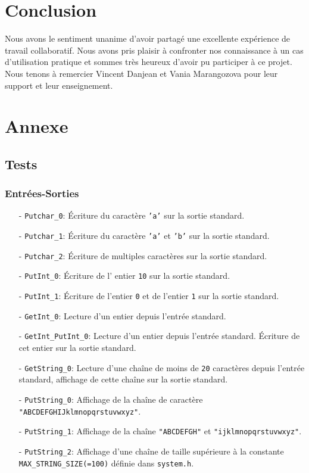 \documentclass[11pt]{article}
\theoremstyle{definition}
\theoremstyle{definition}
\begin{document}
\section{Conclusion}
Nous avons le sentiment unanime d'avoir partagé une excellente expérience de travail collaboratif. Nous avons pris plaisir à confronter nos connaissance à un cas d'utilisation pratique et sommes très heureux d'avoir pu participer à ce projet. Nous tenons à remercier Vincent Danjean et Vania Marangozova pour leur support et leur enseignement.
\section{Annexe}

\subsection{Tests}

\subsubsection{Entrées-Sorties}
\begin{itemize}
\item[-] \texttt{Putchar\_0}: Écriture du caractère \texttt{'a'} sur la sortie standard.
\item[-] \texttt{Putchar\_1}: Écriture du caractère \texttt{'a'} et \texttt{'b'} sur la sortie standard.
\item[-] \texttt{Putchar\_2}: Écriture de multiples caractères sur la sortie standard.
\item[-] \texttt{PutInt\_0}: Écriture de l' entier \texttt{10} sur la sortie standard.
\item[-] \texttt{PutInt\_1}: Écriture de l'entier \texttt{0} et de l'entier \texttt{1} sur la sortie standard.
\item[-] \texttt{GetInt\_0}: Lecture d'un entier depuis l'entrée standard.
\item[-] \texttt{GetInt\_PutInt\_0}:
  Lecture d'un entier depuis l'entrée standard.
  Écriture de cet entier sur la sortie standard.
\item[-] \texttt{GetString\_0}: Lecture d'une chaîne de moins de \texttt{20} caractères depuis l'entrée standard, affichage de cette chaîne sur la sortie standard.
\item[-] \texttt{PutString\_0}: Affichage de la chaîne de caractère \texttt{"ABCDEFGHIJklmnopqrstuvwxyz"}.
\item[-] \texttt{PutString\_1}: Affichage de la chaîne \texttt{"ABCDEFGH"} et \texttt{"ijklmnopqrstuvwxyz"}.
\item[-] \texttt{PutString\_2}:   Affichage d'une chaîne de taille supérieure à la
  constante \texttt{MAX\_STRING\_SIZE(=100)} définie dans \texttt{system.h}.
\end{itemize}
\end{document}

